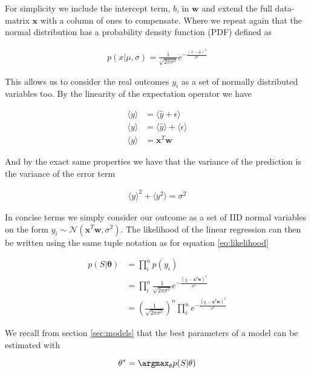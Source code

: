 \noindent For simplicity we include the intercept term, $b$,  in $\mathbf{w}$ and extend the full data-matrix $\mathbf{x}$ with a column of ones to compensate. Where we repeat again that the normal distribution has a probability density function (PDF) defined as 

\begin{align}
p(x | \mu, \sigma) = \frac{1}{\sqrt{2\pi \sigma^2}}e^{-\frac{(x - \mu)^2}{\sigma^2}}
\end{align}

\noindent This allows us to consider the real outcomes $y_i$ as a set of normally distributed variables too. By the linearity of the expectation operator we have 

\begin{align}
\langle y \rangle &= \langle \hat{y} + \epsilon \rangle  \\
\langle y \rangle &= \langle \hat{y} \rangle + \langle \epsilon \rangle \\
\langle y \rangle &= \mathbf{x}^T\mathbf{w}
\end{align}

\noindent And by the exact same properties we have that the variance of the prediction is the variance of the error term 

\begin{align}
\langle y\rangle^2 + \langle y^2\rangle = \sigma^2
\end{align}

\noindent In concise terms we simply consider our outcome as a set of IID normal variables on the form $y_i \sim \mathcal{N}(\mathbf{x}^T\mathbf{w}, \sigma^2)$. The likelihood of the linear regression can then be written using the same tuple notation as for equation \ref{eq:likelihood}

\begin{align}
p(S|\mathbf{\theta}) &= \prod_i^n p(y_i) \\
&= \prod_i^n \frac{1}{\sqrt{2\pi \sigma^2}}e^{-\frac{(y_i - \mathbf{x}^T\mathbf{w})^2}{\sigma^2}} \\
&= \left(\frac{1}{\sqrt{2\pi \sigma^2}} \right)^n \prod_i^n e^{-\frac{(y_i - \mathbf{x}^T\mathbf{w})^2}{\sigma^2}}
\end{align}

\noindent We recall from section \ref{sec:models} that the best parameters of a model can be estimated with 

\begin{equation}
\mathbf{\theta}^* = \argmax_\mathbf{\theta} p(S|\mathbf{\theta})
\end{equation}

